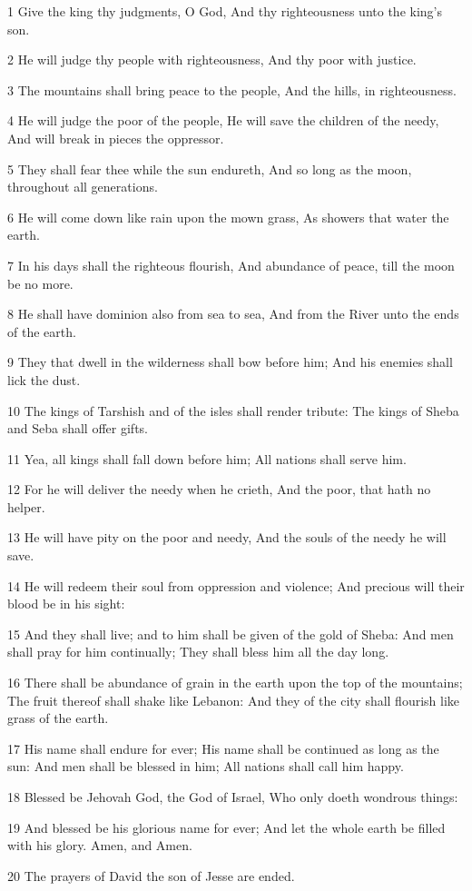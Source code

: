 \par 1 Give the king thy judgments, O God, And thy righteousness unto the king's son.
\par 2 He will judge thy people with righteousness, And thy poor with justice.
\par 3 The mountains shall bring peace to the people, And the hills, in righteousness.
\par 4 He will judge the poor of the people, He will save the children of the needy, And will break in pieces the oppressor.
\par 5 They shall fear thee while the sun endureth, And so long as the moon, throughout all generations.
\par 6 He will come down like rain upon the mown grass, As showers that water the earth.
\par 7 In his days shall the righteous flourish, And abundance of peace, till the moon be no more.
\par 8 He shall have dominion also from sea to sea, And from the River unto the ends of the earth.
\par 9 They that dwell in the wilderness shall bow before him; And his enemies shall lick the dust.
\par 10 The kings of Tarshish and of the isles shall render tribute: The kings of Sheba and Seba shall offer gifts.
\par 11 Yea, all kings shall fall down before him; All nations shall serve him.
\par 12 For he will deliver the needy when he crieth, And the poor, that hath no helper.
\par 13 He will have pity on the poor and needy, And the souls of the needy he will save.
\par 14 He will redeem their soul from oppression and violence; And precious will their blood be in his sight:
\par 15 And they shall live; and to him shall be given of the gold of Sheba: And men shall pray for him continually; They shall bless him all the day long.
\par 16 There shall be abundance of grain in the earth upon the top of the mountains; The fruit thereof shall shake like Lebanon: And they of the city shall flourish like grass of the earth.
\par 17 His name shall endure for ever; His name shall be continued as long as the sun: And men shall be blessed in him; All nations shall call him happy.
\par 18 Blessed be Jehovah God, the God of Israel, Who only doeth wondrous things:
\par 19 And blessed be his glorious name for ever; And let the whole earth be filled with his glory. Amen, and Amen.
\par 20 The prayers of David the son of Jesse are ended.

